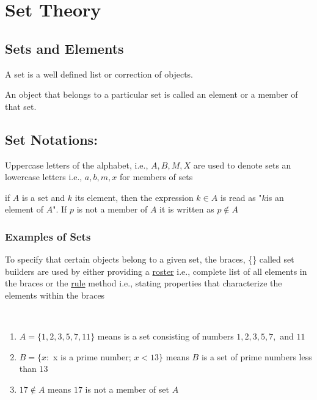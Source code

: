 \chapter{Set Theory}%

\section{Sets and Elements}
\begin{definition}
    A set is a well defined list or correction of objects.
\end{definition}

\begin{definition}
    An object that belongs to a particular set is called an element or a member of that set.
\end{definition}

\section{Set Notations:}

\begin{para}
    Uppercase letters of the alphabet, i.e., $A, B, M, X$ are used to denote sets an lowercase letters i.e., $a, b, m, x$ for members of sets
\end{para}

\begin{para}
    if $A$ is a set and $k$ its element, then the expression $k \in A$ is read as "$k$is an element of $A$". If $p$ is not a member of $A$ it is written as $p \notin A$
\end{para}

\subsection{Examples of Sets}

\begin{para}
    To specify that certain objects belong to a given set, the braces, \{\} called set builders are used by either providing a \underline{roster} i.e., complete list of all elements in the braces or the \underline{rule} method i.e., stating properties that characterize the elements within the braces
\end{para}

\begin{examples}
    \mbox{}\\[-\baselineskip] %
    \begin{enumerate}
        \item $A = \{1,2,3,5,7,11\}$ means is a set consisting of numbers $1,2,3,5,7,$ and $11$
        \item $B = \{x:$ x is a prime number; $x < 13\}$ means $B$ is a set of prime numbers less than $13$
        \item $17 \notin A$ means $17$ is not a member of set $A$
    \end{enumerate}
\end{examples}

